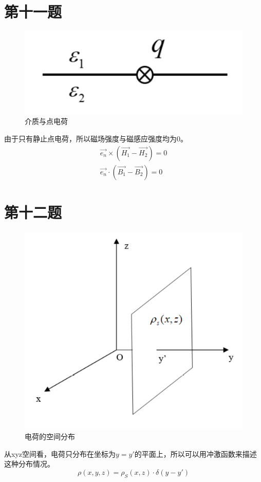 \documentclass[a4paper]{article}
\begin{document}
	\section{第十一题}
		\begin{figure}[htbp]
			\centering
			\includegraphics[scale=0.7]{11.png}
			\caption{介质与点电荷}
		\end{figure}
		由于只有静止点电荷，所以磁场强度与磁感应强度均为0。
		\begin{equation}
			\begin{split}
				\vec{e_n} \times (\vec{H_1} - \vec{H_2}) = 0\\
				\vec{e_n} \cdot (\vec{B_1} - \vec{B_2}) = 0
			\end{split}
 		\end{equation}
	\section{第十二题}
		\begin{figure}[htbp]
			\centering
			\includegraphics[scale=0.6]{12.png}
			\caption{电荷的空间分布}
		\end{figure}
		从xyz空间看，电荷只分布在坐标为$y=y'$的平面上，所以可以用冲激函数来描述这种分布情况。
		\begin{equation}
			\rho(x,y,z) = \rho_S(x,z) \cdot \delta(y-y')
		\end{equation}
\end{document}
